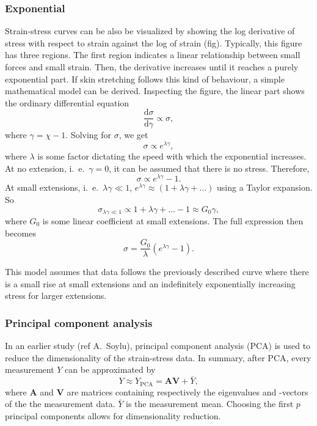 \subsubsection{Exponential}
Strain-stress curves can be also be visualized by showing the log derivative of stress with respect to strain against the log of strain (fig).
Typically, this figure has three regions.
The first region indicates a linear relationship between small forces and small strain.
Then, the derivative increases until it reaches a purely exponential part.
If skin stretching follows this kind of behaviour, a simple mathematical model can be derived.
Inspecting the figure, the linear part shows the ordinary differential equation
\begin{equation}
    \frac{\mathrm{d}\sigma}{\mathrm{d}\gamma} \propto \sigma,
\end{equation}
where $\gamma = \chi - 1$.
Solving for $\sigma$, we get
\begin{equation}
    \sigma \propto e^{\lambda\gamma},
\end{equation}
where $\lambda$ is some factor dictating the speed with which the exponential increases.
At no extension, i.\ e.\ $\gamma=0$, it can be assumed that there is no stress.
Therefore,
\begin{equation}
    \sigma \propto e^{\lambda\gamma} - 1.
\end{equation}
At small extensions, i.\ e.\ $\lambda\gamma \ll 1$, $e^{\lambda\gamma} \approx (1 + \lambda\gamma + \ldots)$ using a Taylor expansion.
So
\begin{equation}
    \sigma_{\lambda\gamma\ll 1} \propto 1 + \lambda\gamma + \ldots - 1 \approx G_0 \gamma,
\end{equation}
where $G_0$ is some linear coefficient at small extensions.
The full expression then becomes
\begin{equation}
    \sigma = \frac{G_0}{\lambda}\left(e^{\lambda\gamma}-1\right).
\end{equation}

This model assumes that data follows the previously described curve where there is a small rise at small extensions and an indefinitely exponentially increasing stress for larger extensions.

\subsubsection{Principal component analysis}
In an earlier study (ref A.\ Soylu), principal component analysis (PCA) is used to reduce the dimensionality of the strain-stress data.
In summary, after PCA, every measurement $Y$ can be approximated by
\begin{equation}
    Y \approx Y_\mathrm{PCA} = \mathbf{A} \mathbf{V} + \bar{Y},
\end{equation}
where $\mathbf{A}$ and $\mathbf{V}$ are matrices containing respectively the eigenvalues and -vectors of the the measurement data.
$\bar{Y}$ is the measurement mean.
Choosing the first $p$ principal components allows for dimensionality reduction.

